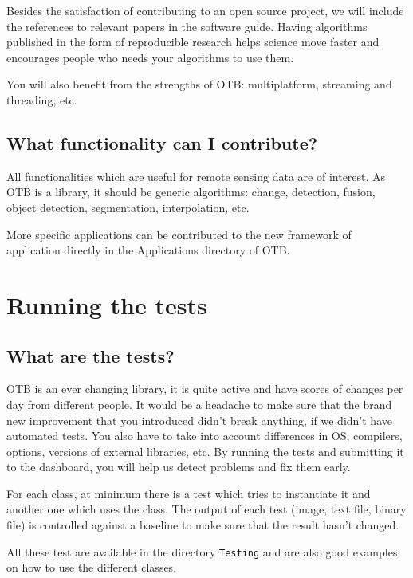 Besides the satisfaction of contributing to an open source project, we will include
the references to relevant papers in the software guide. Having algorithms
published in the form of reproducible research helps science move faster and
encourages people who needs your algorithms to use them.

You will also benefit from the strengths of OTB: multiplatform, streaming and
threading, etc.

\subsection{What functionality can I contribute?}

All functionalities which are useful for remote sensing data are of interest. As
OTB is a library, it should be generic algorithms: change, detection, fusion,
object detection, segmentation, interpolation, etc.

More specific applications can be contributed to the new framework of application
directly in the Applications directory of OTB.

\section{Running the tests}\label{sec:runningTheTests}

\subsection{What are the tests?}

OTB is an ever changing library, it is quite active and have scores of
changes per day from different people. It would be a headache to make
sure that the brand new improvement that you introduced didn't break
anything, if we didn't have automated tests. You also have to take into
account differences in OS, compilers, options, versions of external
libraries, etc. By running the tests and submitting it to the dashboard,
you will help us detect problems and fix them early.

For each class, at minimum there is a test which tries to instantiate it and another one which uses the class. The output of each test (image, text file, binary file) is controlled against a baseline to make sure that the result hasn't changed.

All these test are available in the directory \texttt{Testing} and are also good examples on how to use the different classes.

